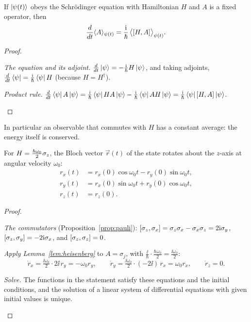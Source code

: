 \begin{lemma}\label{lem:heisenberg}
  If $\left|\psi(t)\right\rangle$ obeys the Schr\"odinger equation with Hamiltonian $H$ and $A$ is a fixed operator, then
  \[
    \frac{d}{dt}\langle A\rangle_{\psi(t)}=\frac{\mathrm{i}}\hbar\,\bigl\langle\left[H,A\right]\bigr\rangle_{\psi(t)} .
  \]
\end{lemma}
\begin{proof}
  \begin{steps}
    \item \emph{The equation and its adjoint.} $\frac{d}{dt}\left|\psi\right\rangle=-\frac{\mathrm{i}}\hbar H\left|\psi\right\rangle$, and taking adjoints, $\frac{d}{dt}\left\langle\psi\right|=\frac{\mathrm{i}}\hbar\left\langle\psi\right| H$ (because $H=H^\dagger$).
    \item \emph{Product rule.} $\frac{d}{dt}\left\langle\psi\right| A\left|\psi\right\rangle=\frac{\mathrm{i}}\hbar\left\langle\psi\right| HA\left|\psi\right\rangle-\frac{\mathrm{i}}\hbar\left\langle\psi\right| AH\left|\psi\right\rangle=\frac{\mathrm{i}}\hbar\left\langle\psi\right|\left[H,A\right]\left|\psi\right\rangle$. \qedhere
  \end{steps}
\end{proof}

In particular an observable that commutes with $H$ has a constant average: the energy itself is conserved.

\begin{proposition}\label{prop:larmor}
  For $H=\tfrac{\hbar\omega_0}2\sigma_z$, the Bloch vector $\vec r(t)$ of the state rotates about the $z$-axis at angular velocity $\omega_0$:
  \[
    \begin{aligned}
      r_x(t)&=r_x(0)\cos\omega_0t-r_y(0)\sin\omega_0t,\\
      r_y(t)&=r_x(0)\sin\omega_0t+r_y(0)\cos\omega_0t,\\
      r_z(t)&=r_z(0).
    \end{aligned}
  \]
\end{proposition}
\begin{proof}
  \begin{steps}
    \item \emph{The commutators} (Proposition~\ref{prop:pauli}): $\left[\sigma_z,\sigma_x\right]=\sigma_z\sigma_x-\sigma_x\sigma_z=2\mathrm{i}\sigma_y$, $\left[\sigma_z,\sigma_y\right]=-2\mathrm{i}\sigma_x$, and $\left[\sigma_z,\sigma_z\right]=0$.
    \item \emph{Apply Lemma~\ref{lem:heisenberg}} to $A=\sigma_j$, with $\tfrac\ii\hbar\cdot\tfrac{\hbar\omega_0}{2}=\tfrac{\ii\omega_0}2$:
      \[
        \dot r_x=\tfrac{\ii\omega_0}2\cdot2\ii\,r_y=-\omega_0r_y,\qquad\dot r_y=\tfrac{\ii\omega_0}2\cdot(-2\ii)\,r_x=\omega_0r_x,\qquad\dot r_z=0 .
      \]
    \item \emph{Solve.} The functions in the statement satisfy these equations and the initial conditions, and the solution of a linear system of differential equations with given initial values is unique. \qedhere
  \end{steps}
\end{proof}

